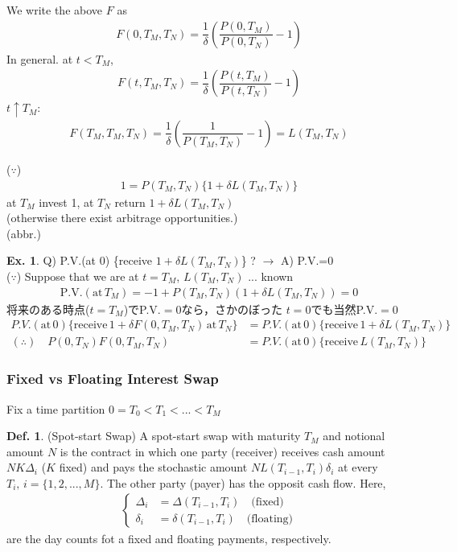 \documentclass[a4paper,11pt]{jsarticle}
\theoremstyle{definition}
\newtheorem{definition}{Def.}[subsection]
\newtheorem{ex}{Ex.}[subsection]
\newcommand{\df}[2]{\dfrac{#1}{#2}}
\begin{document}
We write the above $F$ as
\begin{align}
  F(0,T_M,T_N)=\df{1}{\delta}\left(\df{P(0,T_M)}{P(0,T_N)}-1\right)
\end{align}
In general. at $t<T_M$,
\begin{align}
  F(t,T_M,T_N)=\df{1}{\delta}\left(\df{P(t,T_M)}{P(t,T_N)}-1\right)
\end{align}
$t\uparrow T_M$:
\begin{align}
  F(T_M,T_M,T_N)=\df{1}{\delta}\left(\df{1}{P(T_M,T_N)}-1\right)
  =L(T_M,T_N)
\end{align}

($\because$)
\begin{align}
  1=P(T_M,T_N)\{1+\delta L(T_M,T_N)\}
\end{align}
at $T_M$ invest 1, at $T_N$ return $1+\delta L(T_M,T_N)$ \\
(otherwise there exist arbitrage opportunities.) \\
(abbr.)

\begin{ex}
  Q) P.V.(at $0$) \{receive $1+\delta L(T_M,T_N)$\} ?
  $\rightarrow$ A) P.V.=0 \\
  ($\because$)
  Suppose that we are at $t=T_M$, $L(T_M,T_N)$ ... known 
  \begin{align}
    \mbox{P.V.}(\mbox{at} \, T_M)=-1+P(T_M,T_N)(1+\delta L(T_M,T_N))=0
  \end{align}
  将来のある時点($t=T_M$)でP.V.$=0$なら，さかのぼった
  $t=0$でも当然P.V.$=0$
  \begin{align}
    P.V.(\mbox{at} \, 0)\{\mbox{receive}\,
    1+\delta F(0,T_M,T_N) \, \mbox{at} \, T_N\}
    &= P.V.(\mbox{at} \, 0) \{\mbox{receive} \,
    1+\delta L(T_M,T_N)\} \\
    ( \therefore ) \quad
    P(0,T_N)F(0,T_M,T_N)&=P.V.(\mbox{at} \, 0)
    \{ \mbox{receive} \, L(T_M,T_N)  \}
  \end{align}
\end{ex}


\subsubsection{Fixed vs Floating Interest Swap}
Fix a time partition $0=T_0<T_1<...<T_M$

\begin{definition}{(Spot-start Swap)}
  A spot-start swap with maturity $T_M$ and notional amount
  $N$ is the contract in which one party (receiver)
  receives cash amount $NK\Delta_i$ ($K$ fixed)
  and pays the stochastic amount
  $NL(T_{i-1},T_i)\delta_i$ at every $T_i, \, i=\{1,2,...,M\}$.
  The other party (payer) has the opposit cash flow. Here,
  \begin{align}
    \begin{cases}
      \Delta_i &= \Delta(T_{i-1},T_i) \quad \mbox{(fixed)}\\
      \delta_i &= \delta(T_{i-1},T_i) \quad \mbox{(floating)}
    \end{cases}
  \end{align}
  are the day counts fot a fixed and floating payments, respectively.
\end{definition}
\end{document}
